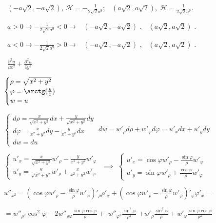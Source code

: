\documentclass{report}
\begin{document}
\ $ (-a\sqrt{2}, -a\sqrt{2}),\ \mathcal{H} = -\frac{1}{2\sqrt{2}a^9}; $
\ $ (a\sqrt{2}, a\sqrt{2}),\ \mathcal{H} = \frac{1}{2\sqrt{2}a^9}. $

\ $ a > 0 \rightarrow  -\frac{1}{2\sqrt{2}a^9} < 0 \rightarrow $
\ $ (-a\sqrt{2}, -a\sqrt{2}) $ ,\
\ $ (a\sqrt{2}, a\sqrt{2}) $ .

\ $ a < 0 \rightarrow  -\frac{1}{2\sqrt{2}a^9} > 0 \rightarrow $
\text{точка}\ $ (-a\sqrt{2}, -a\sqrt{2}) $ \text{-- max},\
\text{а}\ $ (a\sqrt{2}, a\sqrt{2}) $ .

\
$ \frac{\partial^2 u}{\partial x^2} + \frac{\partial^2 u}{\partial y^2} $

$ \begin{cases}
    \rho = \sqrt{x^2 + y^2}\\
    \varphi = \arctg(\frac{y}{x})\\
    w = u
\end{cases} $

$ \begin{cases}
    d\rho = \frac{x}{\sqrt{x^2 + y^2}} dx + \frac{y}{\sqrt{x^2 + y^2}} dy\\
    d\varphi = \frac{x}{x^2 + y^2} dy - \frac{y}{x^2 + y^2} dx\\
    dw = du
\end{cases} $
\indent
$ dw = w'_{\rho} d\rho + w'_{\varphi} d\varphi = u'_x dx + u'_y dy $

$ \begin{cases}
    u'_x = \frac{x}{\sqrt{x^2 + y^2}} w'_{\rho} - \frac{y}{x^2 + y^2} w'_{\varphi}\\
    u'_y = \frac{y}{\sqrt{x^2 + y^2}} w'_{\rho} + \frac{x}{x^2 + y^2} w'_{\varphi}
\end{cases} $
$ \implies $
$ \begin{cases}
    u'_x = \cos{\varphi} w'_{\rho} - \frac{\sin{\varphi}}{\rho} w'_{\varphi}\\
    u'_y = \sin{\varphi} w'_{\rho} + \frac{\cos{\varphi}}{\rho} w'_{\varphi}
\end{cases} $

$ u''_{x^{2}} = \left(\cos{\varphi} w'_{\rho} - \frac{\sin{\varphi}}{\rho} w'_{\varphi}\right)'_\rho
\rho'_x + \left( \cos{\varphi} w'_{\rho} - \frac{\sin{\varphi}}{\rho} w'_{\varphi}\right)'_\varphi \varphi'_x = $

$ = w''_{\rho^2}\cos^2{\varphi} - 2 w''_{\rho\varphi} \frac{\sin{\varphi} \cos{\varphi}}{\rho} + $
$ w''_{\varphi^2} \frac{\sin^2{\varphi}}{\rho^2} $
$ + w'_\rho \frac{\sin^2{\varphi}}{\rho} + w'_\varphi \frac{\sin{\varphi}\cos{\varphi}}{\rho^2} $
\end{document}
